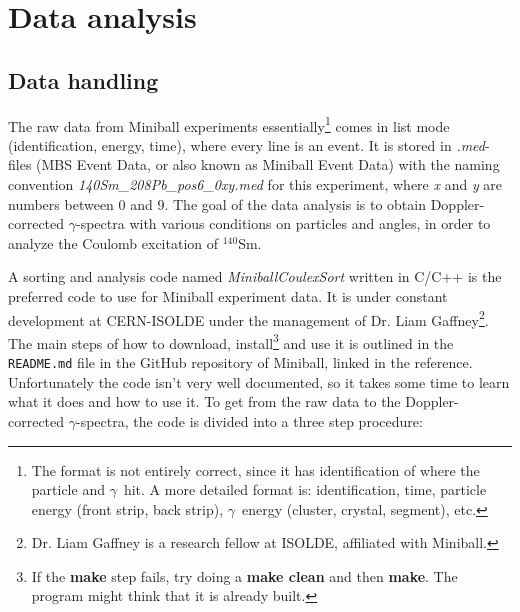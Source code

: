 \documentclass[twoside,english]{uiofysmaster/uiofysmaster}
\newcommand{\Sm}{$^{140}$Sm} %
\newcommand{\ga}{$\gamma$}
\begin{document}


\chapter{Data analysis}  

\section{Data handling}
The raw data from Miniball experiments essentially\footnote{The format is not entirely correct, since it has identification of where the particle and \ga\ hit. A more detailed format is: identification, time, particle energy (front strip, back strip), \ga\ energy (cluster, crystal, segment), etc.} comes in list mode (identification, energy, time), where every line is an event. It is stored in \textit{.med}-files (MBS Event Data, or also known as Miniball Event Data) with the naming convention \textit{140Sm\_208Pb\_pos6\_0xy.med} for this experiment, where \textit{x} and \textit{y} are numbers between 0 and 9. The goal of the data analysis is to obtain Doppler-corrected \ga-spectra with various conditions on particles and angles, in order to analyze the Coulomb excitation of \Sm. 


A sorting and analysis code named \textsl{MiniballCoulexSort} \cite{MBCS} written in C/C++ is the preferred code to use for Miniball experiment data. 
It is under constant development at CERN-ISOLDE under the management of Dr. Liam Gaffney\footnote{Dr. Liam Gaffney is a research fellow at ISOLDE, affiliated with Miniball.}. The main steps of how to download, install\footnote{If the \textbf{make} step fails, try doing a \textbf{make clean} and then \textbf{make}. The program might think that it is already built.} and use it is outlined in the \texttt{README.md} file in the GitHub repository of Miniball, linked in the reference. Unfortunately the code isn't very well documented, so it takes some time to learn what it does and how to use it. To get from the raw data to the Doppler-corrected \ga-spectra, the code is divided into a three step procedure:
\end{document}
